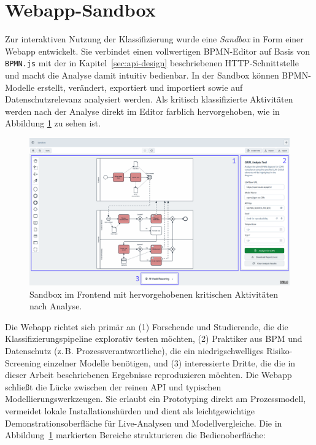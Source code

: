 \section{Webapp-Sandbox}\label{sec:nutzung-uber-webapp}

Zur interaktiven Nutzung der Klassifizierung wurde eine \emph{Sandbox} in Form einer Webapp entwickelt. Sie verbindet einen vollwertigen \ac{BPMN}-Editor auf Basis von \texttt{BPMN.js} \cite{bpmn-js} mit der in Kapitel~\ref{sec:api-design} beschriebenen HTTP-Schnittstelle und macht die Analyse damit intuitiv bedienbar. In der Sandbox können \ac{BPMN}-Modelle erstellt, verändert, exportiert und importiert sowie auf Datenschutzrelevanz analysiert werden. Als kritisch klassifizierte Aktivitäten werden nach der Analyse direkt im Editor farblich hervorgehoben, wie in Abbildung \ref{fig:sandbox-frontend-analyzed-model} zu sehen ist.

\begin{figure}[h]
    \centering
    \includegraphics[width=\linewidth]{images/sandbox/sandbox-analyzed-model-annotated}
    \caption{Sandbox im Frontend mit hervorgehobenen kritischen Aktivitäten nach Analyse.}
    \label{fig:sandbox-frontend-analyzed-model}
\end{figure}

Die Webapp richtet sich primär an (1) Forschende und Studierende, die die Klassifizierungspipeline explorativ testen möchten, (2) Praktiker aus \ac{BPM} und Datenschutz (z.\,B. Prozessverantwortliche), die ein niedrigschwelliges Risiko-Screening einzelner Modelle benötigen, und (3) interessierte Dritte, die die in dieser Arbeit beschriebenen Ergebnisse reproduzieren möchten. Die Webapp schließt die Lücke zwischen der reinen API und typischen Modellierungswerkzeugen. Sie erlaubt ein Prototyping direkt am Prozessmodell, vermeidet lokale Installationshürden und dient als leichtgewichtige Demonstrationsoberfläche für Live-Analysen und Modellvergleiche.
Die in Abbildung~\ref{fig:sandbox-frontend-analyzed-model} markierten Bereiche strukturieren die Bedienoberfläche:

